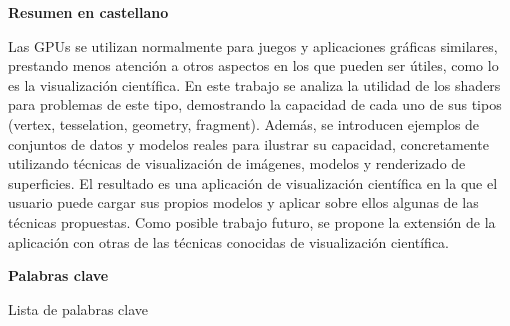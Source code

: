 
\newpage

\thispagestyle{empty}

\begin{center}

{\bf \Huge Resumen en castellano}

  \end{center} \vspace{1cm}

Las GPUs se utilizan normalmente para juegos y aplicaciones gráficas similares,
prestando menos atención a otros aspectos en los que pueden ser útiles, como lo
es la visualización científica. En este trabajo se analiza la utilidad de los
shaders para problemas de este tipo, demostrando la capacidad de cada uno de sus
tipos (vertex, tesselation, geometry, fragment). Además, se introducen ejemplos
de conjuntos de datos y modelos reales para ilustrar su capacidad, concretamente
utilizando técnicas de visualización de imágenes, modelos y renderizado de
superficies. El resultado es una aplicación de visualización científica en la
que el usuario puede cargar sus propios modelos y aplicar sobre ellos algunas de
las técnicas propuestas. Como posible trabajo futuro, se propone la extensión de
la aplicación con otras de las técnicas conocidas de visualización científica.

\vspace{1cm}


\begin{center}

{\bf \Large Palabras clave}

   \end{center}

   \vspace{0.5cm}
   
   Lista de palabras clave
   


